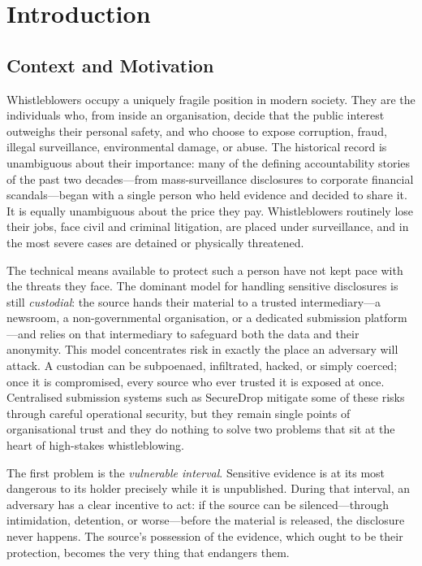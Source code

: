 \chapter{Introduction}
\label{ch:introduction}

\section{Context and Motivation}
\label{sec:intro-context}

Whistleblowers occupy a uniquely fragile position in modern society. They are
the individuals who, from inside an organisation, decide that the public
interest outweighs their personal safety, and who choose to expose corruption,
fraud, illegal surveillance, environmental damage, or abuse. The historical
record is unambiguous about their importance: many of the defining
accountability stories of the past two decades---from mass-surveillance
disclosures to corporate financial scandals---began with a single person who
held evidence and decided to share it. It is equally unambiguous about the price
they pay. Whistleblowers routinely lose their jobs, face civil and criminal
litigation, are placed under surveillance, and in the most severe cases are
detained or physically threatened.

The technical means available to protect such a person have not kept pace with
the threats they face. The dominant model for handling sensitive disclosures is
still \emph{custodial}: the source hands their material to a trusted
intermediary---a newsroom, a non-governmental organisation, or a dedicated
submission platform---and relies on that intermediary to safeguard both the data
and their anonymity. This model concentrates risk in exactly the place an
adversary will attack. A custodian can be subpoenaed, infiltrated, hacked, or
simply coerced; once it is compromised, every source who ever trusted it is
exposed at once. Centralised submission systems such as SecureDrop mitigate some
of these risks through careful operational security, but they remain
single points of organisational trust and they do nothing to solve two problems
that sit at the heart of high-stakes whistleblowing.

The first problem is the \emph{vulnerable interval}. Sensitive evidence is at
its most dangerous to its holder precisely while it is unpublished. During that
interval, an adversary has a clear incentive to act: if the source can be
silenced---through intimidation, detention, or worse---before the material is
released, the disclosure never happens. The source's possession of the evidence,
which ought to be their protection, becomes the very thing that endangers them.

